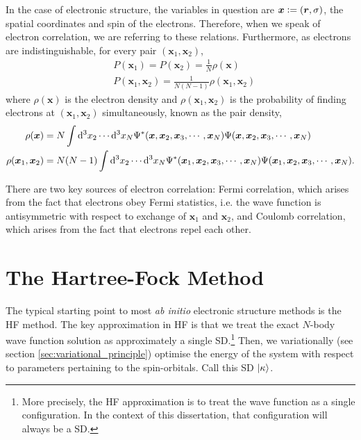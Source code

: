 In the case of electronic structure, the variables in question are $\bm x \mathrel{\mathop:}= (\bm r, \sigma)$, the spatial coordinates and spin of the electrons. Therefore, when we speak of electron correlation, we are referring to these relations. Furthermore, as electrons are indistinguishable, for every pair $(\bm x_1, \bm x_2)$,
\begin{align}
    &P(\bm x_1) = P(\bm x_2) = \frac 1N \rho(\bm x) \\
    &P(\bm x_1, \bm x_2) = \frac 1{N(N-1)} \rho(\bm x_1, \bm x_2)
\end{align}
where $\rho(\bm x)$ is the electron density and $\rho(\bm x_1, \bm x_2)$ is the probability of finding electrons at $(\bm x_1, \bm x_2)$ simultaneously, known as the pair density,
\begin{align}
    \rho(\bm x) &= N\int \mathrm{d}^3x_2 \cdots \mathrm{d}^3x_N \Psi^*(\bm x, \bm x_2, \bm x_3, \cdots, \bm x_N)\Psi(\bm x, \bm x_2, \bm x_3, \cdots, \bm x_N) \\
    \rho(\bm x_1, \bm x_2) &= N(N-1)\int \mathrm{d}^3x_2 \cdots \mathrm{d}^3x_N \Psi^*(\bm x_1, \bm x_2, \bm x_3, \cdots, \bm x_N)\Psi(\bm x_1, \bm x_2, \bm x_3, \cdots, \bm x_N).
\end{align}

There are two key sources of electron correlation: Fermi correlation, which arises from the fact that electrons obey Fermi statistics, i.e. the wave function is antisymmetric with respect to exchange of $\bm x_1$ and $\bm x_2$, and Coulomb correlation, which arises from the fact that electrons repel each other.

\section{The Hartree-Fock Method}
\label{sec:hf}

The typical starting point to most \emph{ab initio} electronic structure methods is the \gls{HF} method.\cite{hartreeWave1928,fockNaherungsmethode1930,slaterNote1930} The key approximation in \gls{HF} is that we treat the exact $N$-body wave function solution as approximately a single \gls{SD}.\footnote{More precisely, the \gls{HF} approximation is to treat the wave function as a single configuration. In the context of this dissertation, that configuration will always be a \gls{SD}.} Then, we variationally (see section \ref{sec:variational_principle}) optimise the energy of the system with respect to parameters pertaining to the spin-orbitals. Call this \gls{SD} $\ket{\kappa}$.

